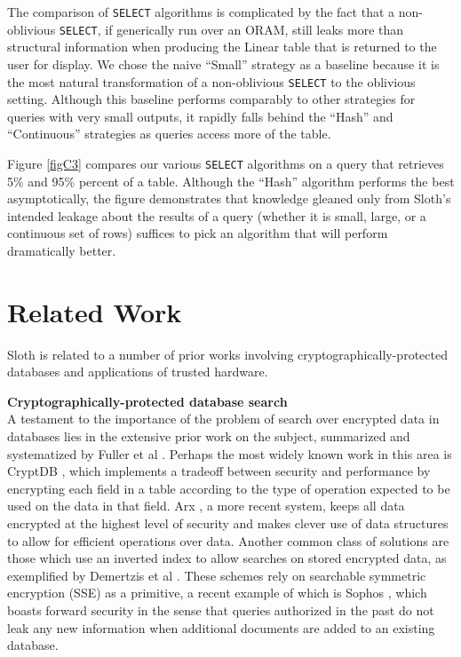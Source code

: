 \documentclass[USenglish,oneside,twocolumn]{article}
\def\name/{Sloth}
\begin{document}
The comparison of \texttt{SELECT} algorithms is complicated by the fact that a non-oblivious \texttt{SELECT}, if generically run over an ORAM, still leaks more than structural information when producing the Linear table that is returned to the user for display. We chose the naive ``Small'' strategy as a baseline because it is the most natural transformation of a non-oblivious \texttt{SELECT} to the oblivious setting. Although this baseline performs comparably to other strategies for queries with very small outputs, it rapidly falls behind the ``Hash'' and ``Continuous'' strategies as queries access more of the table. 

Figure \ref{figC3} compares our various \texttt{SELECT} algorithms on a query that retrieves 5\% and 95\% percent of a table. Although the ``Hash'' algorithm performs the best asymptotically, the figure demonstrates that knowledge gleaned only from \name/'s intended leakage about the results of a query (whether it is small, large, or a continuous set of rows) suffices to pick an algorithm that will perform dramatically better.

\section{Related Work}\label{related}

\name/ is related to a number of prior works involving cryptographically-protected databases and applications of trusted hardware.

\medskip \noindent \textbf{Cryptographically-protected database search}\\
A testament to the importance of the problem of search over encrypted data in databases lies in the extensive prior work on the subject, summarized and systematized by Fuller et al \cite{FVY+17}. Perhaps the most widely known work in this area is CryptDB \cite{PRZB12}, which implements a tradeoff between security and performance by encrypting each field in a table according to the type of operation expected to be used on the data in that field. Arx \cite{PBP16}, a more recent system, keeps all data encrypted at the highest level of security and makes clever use of data structures to allow for efficient operations over data. Another common class of solutions are those which use an inverted index to allow searches on stored encrypted data, as exemplified by Demertzis et al \cite{DPP+16}. These schemes rely on searchable symmetric encryption (SSE) as a primitive, a recent example of which is Sophos \cite{Bost16}, which boasts forward security in the sense that queries authorized in the past do not leak any new information when additional documents are added to an existing database. 
\end{document}
